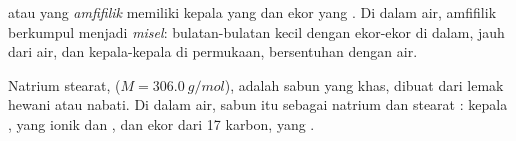 \begin{definition}\label{def:g11:dissolution:amphiphilic}
 atau  yang \emph{amfifilik} memiliki kepala
yang  dan ekor yang . Di dalam air, 
amfifilik berkumpul menjadi \emph{misel}: bulatan-bulatan
kecil dengan ekor-ekor di dalam, jauh dari air, dan kepala-kepala di
permukaan, bersentuhan dengan air.
\end{definition}

\begin{example}\label{ex:g11:dissolution:soap}
Natrium stearat,  ($M = \qty{306.0}{g/mol}$), adalah
sabun yang khas, dibuat dari lemak hewani atau nabati. Di dalam air,
sabun itu  sebagai  natrium  dan  stearat
: kepala , yang ionik dan , dan ekor
dari 17  karbon, yang .
\end{example}

